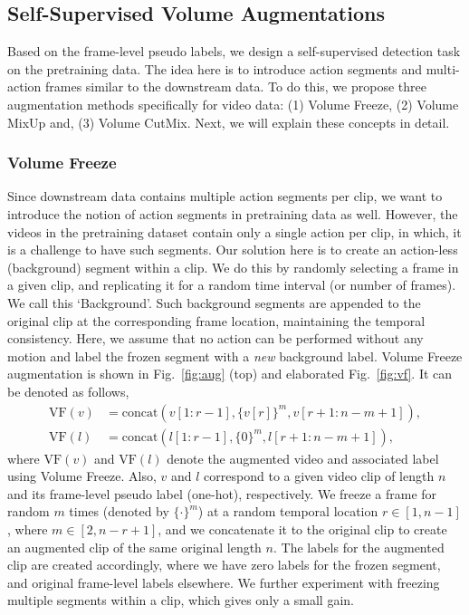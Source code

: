 \documentclass[10pt,twocolumn,letterpaper]{article}
\newcommand{\fref}[1]{Fig.~\ref{#1}}
\begin{document}
\vspace{-1mm}
\subsection{Self-Supervised Volume Augmentations}
\vspace{-1mm}

Based on the frame-level pseudo labels, we design a self-supervised detection task on the pretraining data. The idea here is to introduce action segments and multi-action frames similar to the downstream data. To do this, we propose three augmentation methods specifically for video data: (1) Volume Freeze, (2) Volume MixUp and, (3) Volume CutMix. Next, we will explain these concepts in detail.

\vspace{-3mm}
\subsubsection{Volume Freeze}

Since downstream data contains multiple action segments per clip, we want to introduce the notion of action segments in pretraining data as well. However, the videos in the pretraining dataset contain only a single action per clip, in which, it is a challenge to have such segments. 
Our solution here is to create an action-less (background) segment within a clip. We do this by randomly selecting a frame in a given clip, and replicating it for a random time interval (or number of frames). We call this `Background'. Such background segments are appended to the original clip at the corresponding frame location, maintaining the temporal consistency. Here, we assume that no action can be performed without any motion and label the frozen segment with a \textit{new} background label. Volume Freeze augmentation is shown in \fref{fig:aug} (top) and elaborated \fref{fig:vf}. It can be denoted as follows,
{\small
	\begin{align*}
		\text{VF}(v) &= \text{concat}(v[1:r-1], \{v[r]\}^m, v[r+1:n-m+1]), \\
		\text{VF}(l) &= \text{concat}(l[1:r-1], \{0\}^m, l[r+1:n-m+1]),
	\end{align*}
}%
where $\text{VF}(v)$ and $\text{VF}(l)$ denote the augmented video and associated label using Volume Freeze. Also, $v$ and $l$ correspond to a given video clip of length $n$ and its frame-level pseudo label (one-hot), respectively. We freeze a frame for random $m$ times (denoted by $\{\cdot\}^m$) at a random temporal location $r \in [1,n-1]$, where $m \in [2,n-r+1]$, and we concatenate it to the original clip to create an augmented clip of the same original length $n$. The labels for the augmented clip are created accordingly, where we have zero labels for the frozen segment, and original frame-level labels elsewhere. We further experiment with freezing multiple segments within a clip, which gives only a small gain.
\end{document}
